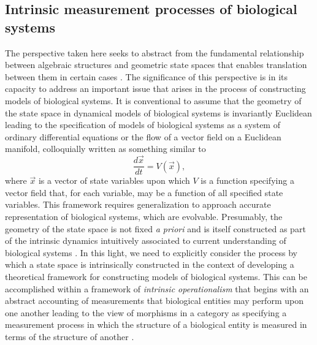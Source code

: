 \documentclass[aps,twocolumn]{revtex4-1}
\begin{document}
\subsection{Intrinsic measurement processes of biological systems}
The perspective taken here seeks to abstract from the fundamental relationship between algebraic structures and geometric state spaces that enables translation between them in certain cases \cite{Nestruev2002}. The significance of this perspective is in its capacity to address an important issue that arises in the process of constructing models of biological systems. It is conventional to assume that the geometry of the state space in dynamical models of biological systems is invariantly Euclidean leading to the specification of models of biological systems as a system of ordinary differential equations or the flow of a vector field on a Euclidean manifold, colloquially written as something similar to
$$
\frac{d \vec{x}}{dt} = V(\vec{x}),
$$ 
where $\vec{x}$ is a vector of state variables upon which $V$ is a function specifying a vector field that, for each variable, may be a function of all specified state variables. This framework requires generalization to approach accurate representation of biological systems, which are evolvable. Presumably, the geometry of the state space is not fixed {\it a priori} and is itself constructed as part of the intrinsic dynamics intuitively associated to current understanding of biological systems \cite{Fontana1994,Fontana1996}. In this light, we need to explicitly consider the process by which a state space is intrinsically constructed in the context of developing a theoretical framework for constructing models of biological systems. This can be accomplished within a framework of {\it intrinsic operationalism} \cite{Bridgman1927} that begins with an abstract accounting of measurements that biological entities may perform upon one another leading to the view of morphisms in a category as specifying a measurement process in which the structure of a biological entity is measured in terms of the structure of another \cite{Rosen1978}.
 
\end{document}

